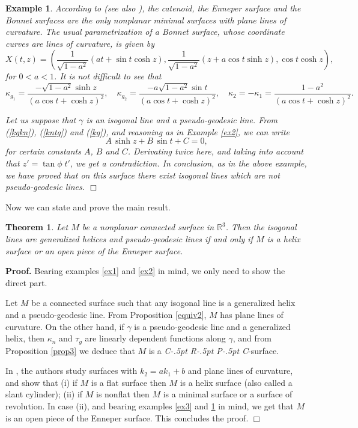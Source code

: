 \documentclass[11pt,a4paper]{article}
\def\R#1{\ensuremath{\mathbb{R}^{#1}}}
\def\g{\gamma}
\newenvironment{proof}{\ignorespaces\par\noindent\textbf{Proof.}\quad}{\hfill$\Box$\par}
\def\CRPC{C\kern-.5pt R\kern-.5pt P\kern-.5pt C}
\newtheorem{theo}{Theorem}
\newtheorem{example}{Example}
\begin{document}
\begin{example}\label{ex4}
According to \cite[pp. 164--166]{Nitsche89} (see also \cite[p. 308]{Eis09}), the catenoid, the Enneper surface and the Bonnet surfaces are the only nonplanar minimal surfaces with plane lines of curvature. The usual parametrization of a Bonnet surface, whose coordinate curves are lines of curvature, is given by
\begin{equation}\label{supbonnet}
  X(t,z)=\left(\frac{1}{\sqrt{1-a^2}}(a t+\sin t\cosh z),\frac{1}{\sqrt{1-a^2}}(z+ a\cos t\sinh z), \cos t\cosh z\right),
\end{equation}
for $0<a<1$. It is not difficult to see that
\[
\kappa_{g_1}=\frac{-\sqrt{1-a^2}\sinh z}{(a\cos t+\cosh z)^2},\quad\kappa_{g_2}=\frac{-a\sqrt{1-a^2}\sin t}{(a\cos t+\cosh z)^2},\quad\kappa_{2}=-\kappa_1=\frac{1-a^2}{(a\cos t+\cosh z)^2}.
\]

Let us suppose that $\gamma$ is an  isogonal line and a pseudo-geodesic line. From (\ref{kgkn}), (\ref{kntg}) and (\ref{kg}), and reasoning as in Example \ref{ex2}, we can write
\[
A\,\sinh z+B\,\sin t+C=0,
\]
for certain constants $A$, $B$ and $C$. Derivating twice here, and taking into account that $z'=\tan\phi\; t'$, we get a contradiction. In conclusion, as in the above example, we have proved that on this surface there exist  isogonal lines which are not pseudo-geodesic lines.
\hfill$\Box$
\end{example}

Now we can state and prove the main result.

\begin{theo}\label{teoprinc}\label{MR}
Let $M$ be a nonplanar connected surface in $\R3$. Then the  isogonal lines are generalized helices and pseudo-geodesic lines if and only if $M$ is a helix surface or an open piece of the Enneper surface.
\end{theo}
\begin{proof}
Bearing examples \ref{ex1} and \ref{ex2} in mind, we only need to show the direct part.

Let $M$ be a connected surface such that any  isogonal line is a generalized helix and a pseudo-geodesic line. From Proposition \ref{equiv2}, $M$ has plane lines of curvature. On the other hand, if $\g$ is a pseudo-geodesic line and a generalized helix, then $\kappa_n$ and $\tau_g$ are linearly dependent functions along $\g$, and from Proposition \ref{prop3} we deduce that $M$ is a \emph{\CRPC}-surface.

In \cite{Kim10}, the authors study surfaces with $k_2=ak_1+b$ and plane lines of curvature, and show that (i) if $M$ is a flat surface then $M$ is a helix surface (also called a slant cylinder); (ii) if $M$ is nonflat then $M$ is a minimal surface or a surface of revolution. In case (ii), and bearing examples \ref{ex3} and \ref{ex4} in mind, we get that $M$ is an open piece of the Enneper surface. This concludes the proof.
\end{proof}
\end{document}
